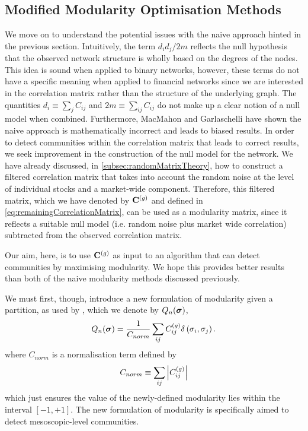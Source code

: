 
\subsection{Modified Modularity Optimisation Methods}
\label{subsec:modifiedModularityOptimisationMethods}

We move on to understand the potential issues with the naive approach hinted in the previous section. Intuitively, the term $d_{i}d_{j}/2m$ reflects the null hypothesis that the observed network structure is wholly based on the degrees of the nodes.
This idea is sound when applied to binary networks, however, these terms do not have a specific meaning when applied to financial networks since we are interested in the correlation matrix rather than the structure of the underlying graph.
The quantities $d_{i} \equiv \sum_{j} C_{ij}$ and $2m \equiv \sum_{ij} C_{ij}$ do not make up a clear notion of a null model when combined.
Furthermore, MacMahon and Garlaschelli \cite{MG13} have shown the naive approach is mathematically incorrect and leads to biased results.
In order to detect communities within the correlation matrix that leads to correct results, we seek improvement in the construction of the null model for the network.
We have already discussed, in \cref{subsec:randomMatrixTheory}, how to construct a filtered correlation matrix that takes into account the random noise at the level of individual stocks and a market-wide component.
Therefore, this filtered matrix, which we have denoted by $\mathbf C^{(g)}$ and defined in \cref{eq:remainingCorrelationMatrix}, can be used as a modularity matrix, since it reflects a suitable null model (i.e. random noise plus market wide correlation) subtracted from the observed correlation matrix.

Our aim, here, is to use $\mathbf C^{(g)}$ as input to an algorithm that can detect communities by maximising modularity.
We hope this provides better results than both of the naive modularity methods discussed previously.

We must first, though, introduce a new formulation of modularity given a partition, as used by \cite{MG13}, which we denote by $Q_{n}(\vecvar{\sigma})$,
\begin{equation}
\label{eq:newModularityFinancialNetworks}
	Q_{n}(\vecvar{\sigma}) = \frac{1}{C_{norm}} \sum_{ij} C^{(g)}_{ij} \delta \left( \sigma_{i},\sigma_{j} \right).
\end{equation}
where $C_{norm}$ is a normalisation term defined by 
\begin{equation}
\label{eq:newModularityNormalisationConstantFinancialNetworks}
	C_{norm} \equiv \sum_{ij} \left\vert C^{(g)}_{ij}\right\vert
\end{equation}
which just ensures the value of the newly-defined modularity lies within the interval $[-1,+1]$.
The new formulation of modularity is specifically aimed to detect mesoscopic-level communities.

